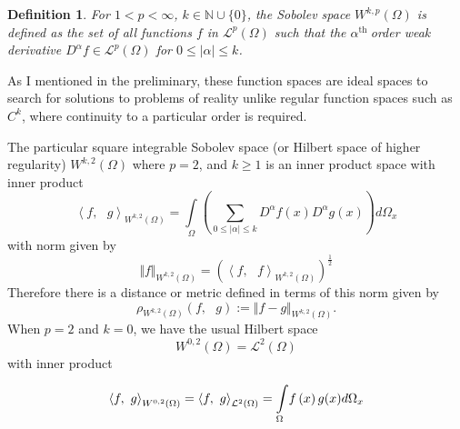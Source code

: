 \documentclass{amsart}%
\providecommand{\U}[1]{\protect\rule{.1in}{.1in}}
\theoremstyle{plain}
\newtheorem{definition}{Definition}
\numberwithin{equation}{section}
\begin{document}
\begin{definition}
For $1<p<\infty$, $k\in%
\mathbb{N}
\cup\{0\}$, the Sobolev space $W^{k,p}\left(  \Omega\right)  $ is defined as
the set of all functions $f$ in $%
\mathcal{L}%
^{p}\left(  \Omega\right)  $ such that the $\alpha^{\text{th }}$order weak
derivative $D^{\alpha}f\in%
\mathcal{L}%
^{p}\left(  \Omega\right)  $ for $0\leq\left\vert \alpha\right\vert \leq k$.
\end{definition}

As I mentioned in the preliminary, these function spaces are ideal spaces to
search for solutions to problems of reality unlike regular function spaces
such as $C^{k}$, where continuity to a particular order is required.

The particular square integrable Sobolev space (or Hilbert space of higher
regularity) $W^{k,2}\left(  \Omega\right)  $ where $p=2$, and $k\geq1$ is an
inner product space with inner product
\begin{equation}
\left\langle f,\text{ }g\right\rangle _{W^{k,2}(\Omega)}=%
{\displaystyle\int\limits_{\Omega}}
\left(
{\displaystyle\sum\limits_{0\leq\mid\alpha\mid\leq k}}
D^{\alpha}f(x)D^{\alpha}g(x)\right)  d\Omega_{x}\label{innerprdct1}%
\end{equation}
with norm given by
\[
\Vert f\Vert_{W^{k,2}(\Omega)}=\left(  \left\langle f,\text{ }f\right\rangle
_{W^{k,2}(\Omega)}\right)  ^{\frac{1}{2}}%
\]
Therefore there is a distance or metric defined in terms of this norm given
by
\begin{equation}
\rho_{W^{k,2}\left(  \Omega\right)  }\left(  f,\text{ }g\right)  :=\Vert
f-g\Vert_{W^{k,2}\left(  \Omega\right)  }.\label{metric 1}%
\end{equation}
When $p=2$ and $k=0$, we have the usual Hilbert space
\[
W^{0,2}\left(  \Omega\right)  =%
\mathcal{L}%
^{2}\left(  \Omega\right)
\]
with inner product%

\begin{equation}
\left\langle f,\text{ }g\right\rangle _{W^{0,2}(\Omega)}=\left\langle f,\text{
}g\right\rangle _{%
\mathcal{L}%
^{2}(\Omega)}=%
{\displaystyle\int\limits_{\Omega}}
f\left(  x\right)  g(x)d\Omega_{x}\label{innerprodct2}%
\end{equation}
\end{document}
